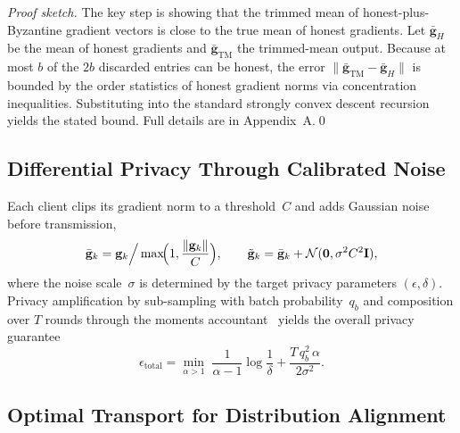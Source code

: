 \noindent\textit{Proof sketch.} The key step is showing that the trimmed mean of honest-plus-Byzantine gradient vectors is close to the true mean of honest gradients. Let $\bar{\mathbf{g}}_H$ be the mean of honest gradients and $\bar{\mathbf{g}}_{\mathrm{TM}}$ the trimmed-mean output. Because at most $b$ of the $2b$ discarded entries can be honest, the error $\|\bar{\mathbf{g}}_{\mathrm{TM}}-\bar{\mathbf{g}}_H\|$ is bounded by the order statistics of honest gradient norms via concentration inequalities. Substituting into the standard strongly convex descent recursion yields the stated bound. Full details are in Appendix~A.\qed

\subsection{Differential Privacy Through Calibrated Noise}

Each client clips its gradient norm to a threshold~$C$ and adds Gaussian noise~\cite{Abadi2016,Dwork2006,Dwork2014} before transmission,
\begin{equation}
\bar{\mathbf{g}}_k = \mathbf{g}_k\Big/\max\!\Bigl(1,\frac{\|\mathbf{g}_k\|}
{C}\Bigr),
\qquad
\tilde{\mathbf{g}}_k = \bar{\mathbf{g}}_k + \mathcal{N}(\mathbf{0},\sigma^2 C^2\mathbf{I}),
\label{eq:fed_dp_noise}
\end{equation}
where the noise scale~$\sigma$ is determined by the target privacy parameters $(\epsilon,\delta)$. Privacy amplification by sub-sampling with batch probability~$q_b$ and composition over $T$ rounds through the moments accountant~\cite{Mironov2017,Balle2018} yields the overall privacy guarantee
\begin{equation}
\epsilon_{\mathrm{total}}
= \min_{\alpha>1}\;
  \frac{1}{\alpha-1}\log\frac{1}{\delta}
  + \frac{T\,q_b^2\,\alpha}{2\sigma^2}.
\label{eq:fed_privacy}
\end{equation}

\subsection{Optimal Transport for Distribution Alignment}

